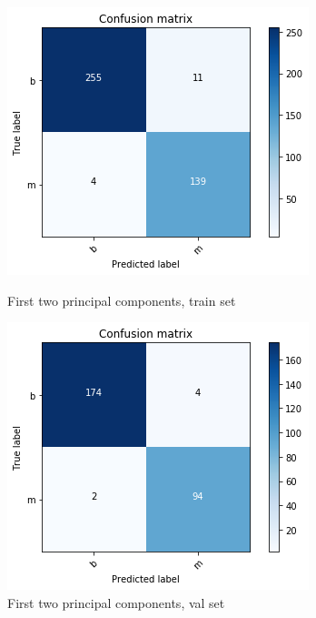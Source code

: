 \documentclass[11pt,a4paper]{article}
\begin{document}
\begin{enumerate}
\begin{enumerate}
	\begin{figure}[H]\centering
		\begin{minipage}{0.49\textwidth}
			\includegraphics[width=\linewidth]{figures/conf_train_pca_12.png}
			\caption{First two principal components, train set}\label{fig:conf_train_pca_12.png}
		\end{minipage}
		\begin{minipage}{0.49\textwidth}
			\includegraphics[width=\linewidth]{figures/conf_val_pca_12.png}
			\caption{First two principal components, val set}\label{fig:conf_val_pca_12.png}
		\end{minipage}
	\end{figure}	
	

\end{enumerate}
\end{enumerate}
\end{document}
